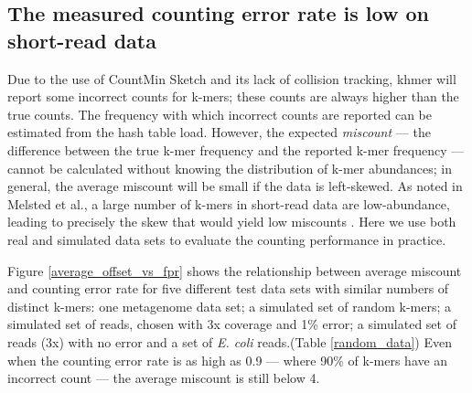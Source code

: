 \documentclass{article}
\begin{document}
\subsection{The measured counting error rate is low on short-read data}

Due to the use of CountMin Sketch and its lack of collision tracking,
khmer will report some incorrect counts for k-mers; these counts are
always higher than the true counts.  The frequency with which
incorrect counts are reported can be estimated from the hash table
load.  However, the expected {\em miscount} --- the difference
between the true k-mer frequency and the reported k-mer frequency --- cannot be
calculated without knowing the distribution of k-mer abundances; in
general, the average miscount will be small if the data is
left-skewed.  As noted in Melsted et al., a large number of k-mers in
short-read data are low-abundance, leading to precisely the skew
that would yield low miscounts \cite{Melsted2011}.  Here we use both
real and simulated data sets to evaluate the counting performance in
practice.

Figure \ref{average_offset_vs_fpr} shows the relationship between
average miscount and counting error rate for five different test data
sets with similar numbers of distinct k-mers: one metagenome data
set; a simulated set of random k-mers; a simulated set of reads,
chosen with 3x coverage and 1\% error; a simulated set of reads (3x)
with no error and a set of {\em E. coli} reads.(Table \ref{random_data})  
Even when the counting error rate is as high as 0.9 ---
where 90\% of k-mers have an incorrect count --- the average miscount is still
below 4.



% 
\end{document}

